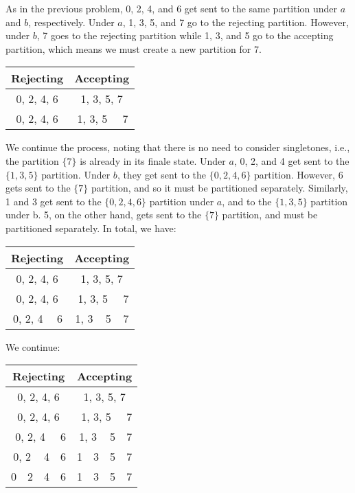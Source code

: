 As in the previous problem, 0, 2, 4, and 6 get sent to the same partition under $a$ and $b$, respectively. Under $a$, 1, 3, 5, and 7 go to the rejecting partition. However, under $b$, 7 goes to the rejecting partition while 1, 3, and 5 go to the accepting partition, which means we must create a new partition for 7.  

\begin{center}\begin{tabular}{|c|c|c|c|c|c|c|c|}
\multicolumn{4}{|c|}{Rejecting} & \multicolumn{4}{|c|}{Accepting}\\\hline
\multicolumn{4}{|c|}{0, 2, 4, 6} & \multicolumn{4}{|c|}{1, 3, 5, 7}\\\hline
\multicolumn{4}{|c|}{0, 2, 4, 6} & \multicolumn{3}{|c|}{1, 3, 5} & 7
\end{tabular}\end{center}

We continue the process, noting that there is no need to consider singletones, i.e., the partition $\{7\}$ is already in its finale state. Under $a$, 0, 2, and 4 get sent to the $\{1, 3, 5\}$ partition. Under $b$, they get sent to the $\{0, 2, 4, 6\}$ partition. However, 6 gets sent to the $\{7\}$ partition, and so it must be partitioned separately. Similarly, 1 and 3 get sent to the $\{0, 2, 4, 6\}$ partition under $a$, and to the $\{1, 3, 5\}$ partition under b. 5, on the other hand, gets sent to the $\{7\}$ partition, and must be partitioned separately. In total, we have:

\begin{center}\begin{tabular}{|c|c|c|c|c|c|c|c|}
\multicolumn{4}{|c|}{Rejecting} & \multicolumn{4}{|c|}{Accepting}\\\hline
\multicolumn{4}{|c|}{0, 2, 4, 6} & \multicolumn{4}{|c|}{1, 3, 5, 7}\\\hline
\multicolumn{4}{|c|}{0, 2, 4, 6} & \multicolumn{3}{|c|}{1, 3, 5} & 7\\\hline
\multicolumn{3}{|c|}{0, 2, 4} & 6 & \multicolumn{2}{|c|}{1, 3} & 5 & 7
\end{tabular}\end{center}

We continue:

\begin{center}\begin{tabular}{|c|c|c|c|c|c|c|c|}
\multicolumn{4}{|c|}{Rejecting} & \multicolumn{4}{|c|}{Accepting}\\\hline
\multicolumn{4}{|c|}{0, 2, 4, 6} & \multicolumn{4}{|c|}{1, 3, 5, 7}\\\hline
\multicolumn{4}{|c|}{0, 2, 4, 6} & \multicolumn{3}{|c|}{1, 3, 5} & 7\\\hline
\multicolumn{3}{|c|}{0, 2, 4} & 6 & \multicolumn{2}{|c|}{1, 3} & 5 & 7\\\hline
\multicolumn{2}{|c|}{0, 2} & 4 & \multicolumn{1}{c|}{6} & \multicolumn{1}{|c|}{1} & 3 & 5 & 7\\\hline
0 & 2 & 4 & \multicolumn{1}{c|}{6} & \multicolumn{1}{|c|}{1} & 3 & 5 & 7
\end{tabular}\end{center}

